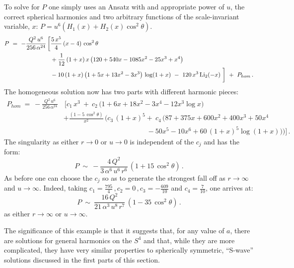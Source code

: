 \documentclass[11pt]{article}
\numberwithin{equation}{section}
\begin{document}
 To solve for $P$ one simply uses  an Ansatz with and appropriate power of $u$, the correct spherical harmonics and two arbitrary functions of the scale-invariant variable, $x$:   $P = u^6 (H_1(x) +  H_2(x) \cos^2 \theta)$.
%
\begin{equation}
\begin{aligned}
P  ~=~ - \frac{Q^2 \, u^6}{256\,\alpha^{24} } \, \bigg[& \frac{5\, x^{5}}{4} \, (x-4) \, \cos^2 \theta \\
& +    \frac{1}{12}\, (1+x) \,  x\,\big( 120 +540 x -1085 x^2- 25 x^3 +x^4\big) \\
&- 10\, (1+x) \,\big(1+5x +13 x^2-3x^3\big)\, \log(1+x) ~-~ 120 \,x^3 \, {\rm Li}_2(-x)\ \bigg]~+~P_{hom}  \,.
\end{aligned}
\label{Pnonsymm1}
\end{equation}
%
The homogeneous solution now has two parts with different harmonic pieces:
%
\begin{equation}
\begin{aligned}
P_{hom}  ~=~ - \frac{Q^2 \, u^6}{256\,\alpha^{24} }& \, \bigg[ c_1 \, x^3 ~+~ c_2\, \big(1 + 6 x + 18 x^2 - 3  x^4 -12 x^3 \log x \big) \\
&+\frac{(1 - 5\, \cos^2 \theta)}{x^2} \, \Big( c_3\, (1+x)^5  +~ c_4 \,\big( 87 +375 x + 600 x^2 + 400 x^3 + 50 x^4 \\
& \qquad\qquad\qquad\qquad\qquad\qquad -50x^5 -10 x^6 + 60\, (1+x)^5 \log(1+x)  \big)\Big)\bigg]   \,.
\end{aligned}
\label{Phomnonsymm1}
\end{equation}
%
The singularity as either $r\to 0$ or $u \to 0$ is independent of the $c_j$ and has the form:
%
\begin{equation}
P  ~\sim~ - \frac{4\, Q^2  }{ 3\,\alpha^{6}\, u^{6}\, r^{6} }\, (1 + 15\, \cos^2 \theta) \,.
\label{Psrc-nonsymm}
\end{equation}
%
As before one can choose the $c_j$ so as to generate the strongest fall off as $r \to \infty$ and $u \to \infty$.  Indeed, taking $c_1 =\frac{795}{4}\,, c_2 =0 \,, c_3 =-\frac{609}{10}$ and $c_4 =\frac{7}{10}$, one arrives at: 
%
\begin{equation}
P  ~\sim~  \frac{16\, Q^2  }{ 21\,\alpha^{3}\, u^{8}\, r^{7} }\, (1 - 35\, \cos^2 \theta) \,.
\label{Pasymp-nonsymm}
\end{equation}
%
as either $r \to \infty$ or $u \to \infty$.

The significance of this example is that it suggests that, for any value of $a$, there are solutions for general harmonics on the $S^4$ and that, while they are  more complicated,  they have very similar properties to spherically symmetric, ``S-wave'' solutions discussed in the first parts of this section.
\end{document}
